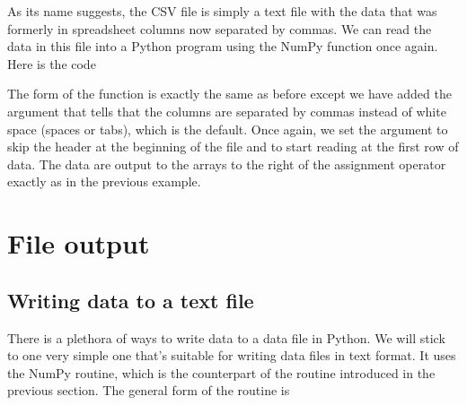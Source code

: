 \documentclass[letterpaper,10pt,english]{sphinxmanual}
\begin{document}
\sphinxAtStartPar
As its name suggests, the CSV file is simply a text file with the data that was formerly in spreadsheet columns now separated by commas.  We can read the data in this file into a Python program using the  NumPy function once again.  Here is the code

\begin{sphinxVerbatim}[commandchars=\\\{\}]
     
\end{sphinxVerbatim}

\sphinxAtStartPar
The form of the function is exactly the same as before except we have added the argument  that tells  that the columns are separated by commas instead of white space (spaces or tabs), which is the default.  Once again, we set the  argument to skip the header at the beginning of the file and to start reading at the first row of data.  The data are output to the arrays to the right of the assignment operator \sphinxcode{\sphinxupquote{=}} exactly as in the previous example.

\ignorespaces 

\section{File output}
\label{\detokenize{chap4/chap4_io:file-output}}\label{\detokenize{chap4/chap4_io:index-5}}

\subsection{Writing data to a text file}
\label{\detokenize{chap4/chap4_io:writing-data-to-a-text-file}}
\sphinxAtStartPar
There is a plethora of ways to write data to a data file in Python.  We will stick to one very simple one that’s suitable for writing data files in text format.  It uses the NumPy  routine, which is the counterpart of the  routine introduced in the previous section.  The general form of the routine is
\end{document}
